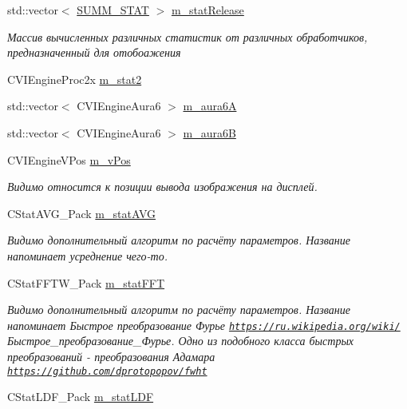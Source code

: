 \begin{DoxyCompactItemize}
std\+::vector$<$ \hyperlink{class_s_u_m_m___s_t_a_t}{S\+U\+M\+M\+\_\+\+S\+T\+A\+T} $>$ \hyperlink{class_c_v_i_engine_base_ab0a3c99fb49cddb42615132833b483d5}{m\+\_\+stat\+Release}
\begin{DoxyCompactList}\small\item\em Массив вычисленных различных статистик от различных обработчиков, предназначенный для отобоажения \end{DoxyCompactList}\item 
C\+V\+I\+Engine\+Proc2x \hyperlink{class_c_v_i_engine_base_a91282745c78c776f8922e20c4f3198f5}{m\+\_\+stat2}
\item 
std\+::vector$<$ C\+V\+I\+Engine\+Aura6 $>$ \hyperlink{class_c_v_i_engine_base_aa4b9c935b9223f0efcc05282e871254d}{m\+\_\+aura6\+A}
\item 
std\+::vector$<$ C\+V\+I\+Engine\+Aura6 $>$ \hyperlink{class_c_v_i_engine_base_a4415e8a105218982c6358907ae6f380e}{m\+\_\+aura6\+B}
\item 
C\+V\+I\+Engine\+V\+Pos \hyperlink{class_c_v_i_engine_base_afab397345881a9b8a44e6f8eae9805f0}{m\+\_\+v\+Pos}
\begin{DoxyCompactList}\small\item\em Видимо относится к позиции вывода изображения на дисплей. \end{DoxyCompactList}\item 
C\+Stat\+A\+V\+G\+\_\+\+Pack \hyperlink{class_c_v_i_engine_base_aad8ff35fe2bc6a8d6da03b8f93ea3341}{m\+\_\+stat\+A\+V\+G}
\begin{DoxyCompactList}\small\item\em Видимо дополнительный алгоритм по расчёту параметров. Название напоминает усреднение чего-\/то. \end{DoxyCompactList}\item 
C\+Stat\+F\+F\+T\+W\+\_\+\+Pack \hyperlink{class_c_v_i_engine_base_a475ef6e1419c21ec5d68097a4cd822ee}{m\+\_\+stat\+F\+F\+T}
\begin{DoxyCompactList}\small\item\em Видимо дополнительный алгоритм по расчёту параметров. Название напоминает Быстрое преобразование Фурье \href{https://ru.wikipedia.org/wiki/}{\tt https\+://ru.\+wikipedia.\+org/wiki/}Быстрое\+\_\+преобразование\+\_\+Фурье. Одно из подобного класса быстрых преобразований -\/ преобразования Адамара \href{https://github.com/dprotopopov/fwht}{\tt https\+://github.\+com/dprotopopov/fwht} \end{DoxyCompactList}\item 
C\+Stat\+L\+D\+F\+\_\+\+Pack \hyperlink{class_c_v_i_engine_base_abb0ef36905047eafd79bea2911824b7f}{m\+\_\+stat\+L\+D\+F}

\end{DoxyCompactItemize}
